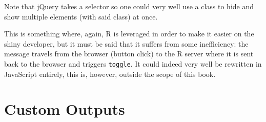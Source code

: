 \documentclass[10pt,]{krantz}
\makeatletter
\newenvironment{Shaded}{\begin{snugshade}}{\end{snugshade}}
\newcommand{\ControlFlowTok}[1]{\textcolor[rgb]{0.27,0.27,0.27}{\textbf{#1}}}
\newcommand{\DataTypeTok}[1]{\textcolor[rgb]{0.27,0.27,0.27}{#1}}
\newcommand{\KeywordTok}[1]{\textcolor[rgb]{0.27,0.27,0.27}{\textbf{#1}}}
\newcommand{\NormalTok}[1]{#1}
\newcommand{\OperatorTok}[1]{\textcolor[rgb]{0.43,0.43,0.43}{\textbf{#1}}}
\newcommand{\StringTok}[1]{\textcolor[rgb]{0.5,0.5,0.5}{#1}}
\newenvironment{kframe}{%
\medskip{}
\setlength{\fboxsep}{.8em}
 \def\at@end@of@kframe{}%
 \ifinner\ifhmode%
  \def\at@end@of@kframe{\end{minipage}}%
  \begin{minipage}{\columnwidth}%
 \fi\fi%
 \def\FrameCommand##1{\hskip\@totalleftmargin \hskip-\fboxsep
 \colorbox{shadecolor}{##1}\hskip-\fboxsep
     \hskip-\linewidth \hskip-\@totalleftmargin \hskip\columnwidth}%
 \MakeFramed {\advance\hsize-\width
   \@totalleftmargin\z@ \linewidth\hsize
   \@setminipage}}%
 {\par\unskip\endMakeFramed%
 \at@end@of@kframe}
\renewenvironment{Shaded}{\begin{kframe}}{\end{kframe}}
\makeatother
\begin{document}
Note that jQuery takes a selector so one could very well use a class to hide and show multiple elements (with said class) at once.

\begin{Shaded}
\end{Shaded}

This is something where, again, R is leveraged in order to make it easier on the shiny developer, but it must be said that it suffers from some inefficiency: the message travels from the browser (button click) to the R server where it is sent back to the browser and triggers \texttt{toggle}. It could indeed very well be rewritten in JavaScript entirely, this is, however, outside the scope of this book.

\hypertarget{shiny-output}{%
\chapter{Custom Outputs}\label{shiny-output}}
\end{document}
